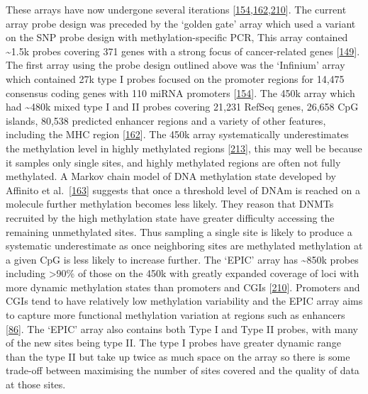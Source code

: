 \documentclass[
]{book}
\begin{document}
These arrays have now undergone several iterations {[}\protect\hyperlink{ref-Bibikova2009}{154},\protect\hyperlink{ref-Bibikova2011}{162},\protect\hyperlink{ref-Moran2015}{210}{]}.
The current array probe design was preceded by the `golden gate' array which used a variant on the SNP probe design with methylation-specific PCR, This array contained \textasciitilde1.5k probes covering 371 genes with a strong focus of cancer-related genes {[}\protect\hyperlink{ref-Bibikova2006}{149}{]}.
The first array using the probe design outlined above was the `Infinium' array which contained 27k type I probes focused on the promoter regions for 14,475 consensus coding genes with 110 miRNA promoters {[}\protect\hyperlink{ref-Bibikova2009}{154}{]}.
The 450k array which had \textasciitilde480k mixed type I and II probes covering 21,231 RefSeq genes, 26,658 CpG islands, 80,538 predicted enhancer regions and a variety of other features, including the MHC region {[}\protect\hyperlink{ref-Bibikova2011}{162}{]}.
The 450k array systematically underestimates the methylation level in highly methylated regions {[}\protect\hyperlink{ref-Clark2012}{213}{]}, this may well be because it samples only single sites, and highly methylated regions are often not fully methylated.
A Markov chain model of DNA methylation state developed by Affinito et al.~{[}\protect\hyperlink{ref-Affinito2016}{163}{]} suggests that once a threshold level of DNAm is reached on a molecule further methylation becomes less likely.
They reason that DNMTs recruited by the high methylation state have greater difficulty accessing the remaining unmethylated sites.
Thus sampling a single site is likely to produce a systematic underestimate as once neighboring sites are methylated methylation at a given CpG is less likely to increase further.
The `EPIC' array has \textasciitilde850k probes including \textgreater90\% of those on the 450k with greatly expanded coverage of loci with more dynamic methylation states than promoters and CGIs {[}\protect\hyperlink{ref-Moran2015}{210}{]}.
Promoters and CGIs tend to have relatively low methylation variability and the EPIC array aims to capture more functional methylation variation at regions such as enhancers {[}\protect\hyperlink{ref-Ziller2013}{86}{]}.
The `EPIC' array also contains both Type I and Type II probes, with many of the new sites being type II.
The type I probes have greater dynamic range than the type II but take up twice as much space on the array so there is some trade-off between maximising the number of sites covered and the quality of data at those sites.
\end{document}

